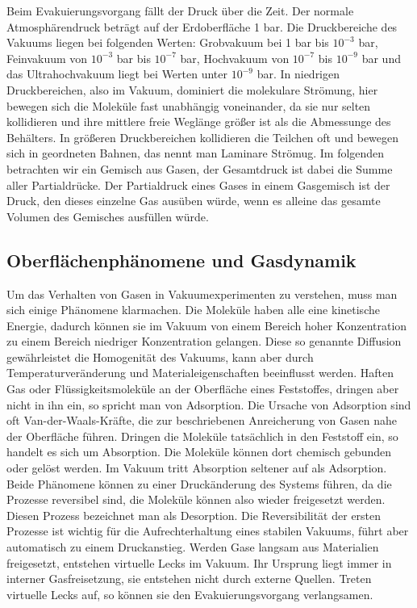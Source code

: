 Beim Evakuierungsvorgang fällt der Druck über die Zeit. Der normale Atmosphärendruck beträgt auf der Erdoberfläche 1 bar.
Die Druckbereiche des Vakuums liegen bei folgenden Werten:
Grobvakuum bei 1 bar bis $10^{-3}$ bar,  Feinvakuum von $10^{-3}$ bar bis $10^{-7}$ bar, Hochvakuum von $10^{-7}$ bis $10^{-9}$ bar und
das Ultrahochvakuum liegt bei Werten unter $10^{-9}$ bar.
In niedrigen Druckbereichen, also im Vakuum, dominiert die molekulare Strömung, hier bewegen sich die Moleküle fast unabhängig voneinander,
da sie nur selten kollidieren und ihre mittlere freie Weglänge größer ist als die Abmessunge des Behälters.
In größeren Druckbereichen kollidieren die Teilchen oft 
und bewegen sich in geordneten Bahnen, das nennt man Laminare Strömug.
Im folgenden betrachten wir ein Gemisch aus Gasen, der Gesamtdruck ist dabei die Summe aller Partialdrücke. Der Partialdruck eines Gases in
einem Gasgemisch ist der Druck, den dieses einzelne Gas ausüben würde, wenn es alleine das gesamte Volumen des Gemisches ausfüllen würde.



\subsection{Oberflächenphänomene und Gasdynamik}


Um das Verhalten von Gasen in Vakuumexperimenten zu verstehen, muss man sich einige Phänomene klarmachen.
Die Moleküle haben alle
eine kinetische Energie, dadurch können sie im Vakuum von einem Bereich hoher Konzentration zu einem Bereich niedriger Konzentration 
gelangen. Diese so genannte Diffusion gewährleistet die Homogenität des Vakuums, kann aber durch Temperaturveränderung und Materialeigenschaften
beeinflusst werden. Haften Gas oder Flüssigkeitsmoleküle an der Oberfläche eines Feststoffes, dringen aber nicht in ihn ein, so spricht man 
von Adsorption. Die Ursache von Adsorption sind oft Van-der-Waals-Kräfte, die zur beschriebenen Anreicherung von Gasen nahe der Oberfläche führen.
Dringen die Moleküle tatsächlich in den Feststoff ein, so handelt es sich um Absorption. Die Moleküle können dort chemisch gebunden oder 
gelöst werden. Im Vakuum tritt Absorption seltener auf als Adsorption. Beide Phänomene können zu einer Druckänderung des Systems führen,
da die Prozesse reversibel sind, die Moleküle können also wieder freigesetzt werden. Diesen Prozess bezeichnet man als Desorption. Die
Reversibilität der ersten Prozesse ist wichtig für die Aufrechterhaltung eines stabilen Vakuums, führt aber automatisch zu einem Druckanstieg. 
Werden Gase langsam aus Materialien freigesetzt, entstehen virtuelle Lecks im Vakuum. Ihr Ursprung liegt immer in interner Gasfreisetzung, 
sie entstehen nicht durch externe Quellen. Treten virtuelle Lecks auf, so können sie den Evakuierungsvorgang verlangsamen.


